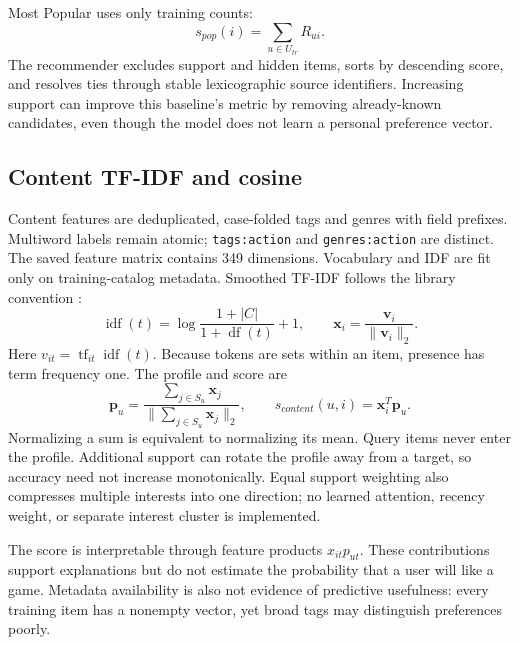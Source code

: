 \documentclass[conference,a4paper]{IEEEtran}
\begin{document}
Most Popular uses only training counts:
\begin{equation}
s_{pop}(i)=\sum_{u\in U_{tr}}R_{ui}.
\end{equation}
The recommender excludes support and hidden items, sorts by descending score, and resolves ties through stable lexicographic source identifiers. Increasing support can improve this baseline's metric by removing already-known candidates, even though the model does not learn a personal preference vector.

\subsection{Content TF-IDF and cosine}
Content features are deduplicated, case-folded tags and genres with field prefixes. Multiword labels remain atomic; \texttt{tags:action} and \texttt{genres:action} are distinct. The saved feature matrix contains 349 dimensions. Vocabulary and IDF are fit only on training-catalog metadata. Smoothed TF-IDF follows the library convention \cite{tfidf}:
\begin{equation}
\operatorname{idf}(t)=\log\frac{1+|C|}{1+\operatorname{df}(t)}+1,
\qquad \mathbf{x}_i=\frac{\mathbf{v}_i}{\|\mathbf{v}_i\|_2}.
\end{equation}
Here $v_{it}=\operatorname{tf}_{it}\operatorname{idf}(t)$. Because tokens are sets within an item, presence has term frequency one. The profile and score are
\begin{equation}
\mathbf{p}_u=\frac{\sum_{j\in S_u}\mathbf{x}_j}
{\|\sum_{j\in S_u}\mathbf{x}_j\|_2},
\qquad s_{content}(u,i)=\mathbf{x}_i^T\mathbf{p}_u.
\end{equation}
Normalizing a sum is equivalent to normalizing its mean. Query items never enter the profile. Additional support can rotate the profile away from a target, so accuracy need not increase monotonically. Equal support weighting also compresses multiple interests into one direction; no learned attention, recency weight, or separate interest cluster is implemented.

The score is interpretable through feature products $x_{it}p_{ut}$. These contributions support explanations but do not estimate the probability that a user will like a game. Metadata availability is also not evidence of predictive usefulness: every training item has a nonempty vector, yet broad tags may distinguish preferences poorly.
\end{document}
